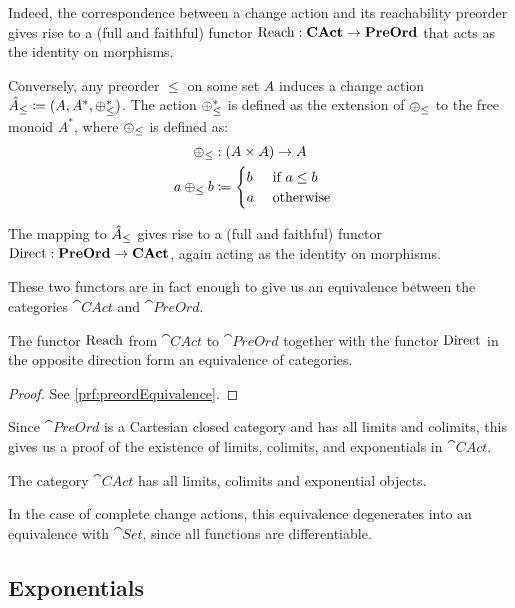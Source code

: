 Indeed, the correspondence between a change action and its reachability preorder gives rise to
a (full and faithful) functor $\operatorname{Reach} : \mathbf{CAct} \rightarrow \mathbf{PreOrd}$ that acts as the
identity on morphisms.

Conversely, any preorder $\leq$ on some set $A$ induces a change action
$\hat{A}_\leq \coloneqq (A,A^\ast,\oplus^\ast_\leq)$.
The action $\oplus^\ast_\leq$ is defined as the extension of $\oplus_\leq$ to the free
monoid $A^\ast$, where $\oplus_\leq$ is defined as:
\[
\begin{aligned}
   \oplus_\leq &: (A \times A) \rightarrow A&\\
   a \oplus_\leq b &\coloneqq
     \begin{cases}
     b&\text{ if $a \leq b$}\\
     a&\text{ otherwise}
     \end{cases}
\end{aligned}
\]

The mapping to $\hat{A}_\leq$ gives rise to a (full and faithful) functor
$\operatorname{Direct} : \mathbf{PreOrd} \rightarrow \mathbf{CAct}$, again acting as the identity on morphisms.

These two functors are in fact enough to give us an equivalence between the categories
$\cat{CAct}$ and $\cat{PreOrd}$.

\begin{thm}[name=Equivalence of $\cat{CAct}$ and $\cat{PreOrd}$, restate=preordEquivalence]
  \label{thm:preordEquivalence}
  The functor $\operatorname{Reach}$ from $\cat{CAct}$ to $\cat{PreOrd}$ together with the
  functor $\operatorname{Direct}$ in the opposite direction form an equivalence of categories.
\end{thm}
\ifproofs
\begin{proof}
  See \cref{prf:preordEquivalence}.
\end{proof}
\fi

Since $\cat{PreOrd}$ is a Cartesian closed category and has all limits and
colimits, this gives us a proof of the existence of limits, colimits, and exponentials in $\cat{CAct}$.

\begin{corollary}
  The category $\cat{CAct}$ has all limits, colimits and exponential objects.
\end{corollary}

In the case of complete change actions, this equivalence degenerates into an
equivalence with $\cat{Set}$, since all functions are differentiable.

\subsection{Exponentials}
\label{sec:exponentials}

